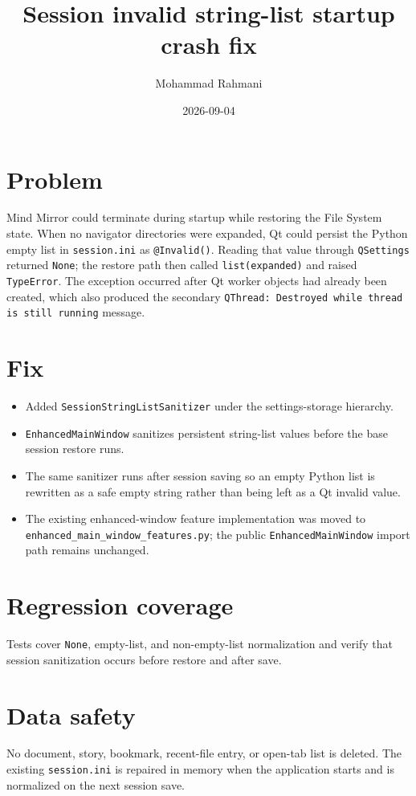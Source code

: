 \documentclass[a4paper]{article}
\title{Session invalid string-list startup crash fix}
\date{2026-09-04}
\author{Mohammad Rahmani}
\begin{document}
\maketitle

\section{Problem}
Mind Mirror could terminate during startup while restoring the File System state.
When no navigator directories were expanded, Qt could persist the Python empty
list in \texttt{session.ini} as \texttt{@Invalid()}. Reading that value through
\texttt{QSettings} returned \texttt{None}; the restore path then called
\texttt{list(expanded)} and raised \texttt{TypeError}. The exception occurred
after Qt worker objects had already been created, which also produced the
secondary \texttt{QThread: Destroyed while thread is still running} message.

\section{Fix}
\begin{itemize}
   \item Added \texttt{SessionStringListSanitizer} under the settings-storage hierarchy.
   \item \texttt{EnhancedMainWindow} sanitizes persistent string-list values before the base session restore runs.
   \item The same sanitizer runs after session saving so an empty Python list is rewritten as a safe empty string rather than being left as a Qt invalid value.
   \item The existing enhanced-window feature implementation was moved to \texttt{enhanced\_main\_window\_features.py}; the public \texttt{EnhancedMainWindow} import path remains unchanged.
\end{itemize}

\section{Regression coverage}
Tests cover \texttt{None}, empty-list, and non-empty-list normalization and verify
that session sanitization occurs before restore and after save.

\section{Data safety}
No document, story, bookmark, recent-file entry, or open-tab list is deleted.
The existing \texttt{session.ini} is repaired in memory when the application
starts and is normalized on the next session save.
\end{document}
